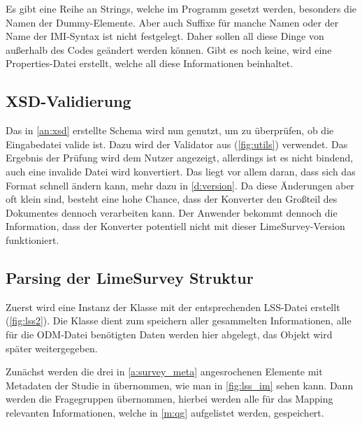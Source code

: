 Es gibt eine Reihe an Strings, welche im Programm gesetzt werden, besonders die Namen der Dummy-Elemente.
Aber auch Suffixe für manche Namen oder der Name der IMI-Syntax ist nicht festgelegt.
Daher sollen all diese Dinge von außerhalb des Codes geändert werden können.
Gibt es noch keine, wird eine Properties-Datei erstellt, welche all diese Informationen beinhaltet.

\subsection{XSD-Validierung}


Das in \cref{an:xsd} erstellte Schema wird nun genutzt, um zu überprüfen, ob die Eingabedatei valide ist.
Dazu wird der Validator aus  (\cref{fig:utils}) verwendet.
Das Ergebnis der Prüfung wird dem Nutzer angezeigt, allerdings ist es nicht bindend, auch eine invalide Datei wird konvertiert.
Das liegt vor allem daran, dass sich das Format schnell ändern kann, mehr dazu in \cref{d:version}.
Da diese Änderungen aber oft klein sind, besteht eine hohe Chance, dass der Konverter den Großteil des Dokumentes dennoch verarbeiten kann.
Der Anwender bekommt dennoch die Information, dass der Konverter potentiell nicht mit dieser LimeSurvey-Version funktioniert.

\subsection{Parsing der LimeSurvey Struktur}

Zuerst wird eine Instanz der Klasse  mit der entsprechenden LSS-Datei erstellt (\cref{fig:lss2}).
Die Klasse  dient zum speichern aller gesammelten Informationen, alle für die ODM-Datei benötigten Daten werden hier abgelegt, das Objekt wird später weitergegeben.

Zunächst werden die drei in \cref{a:survey_meta} angesrochenen Elemente mit Metadaten der Studie in  übernommen, wie man in \cref{fig:lss_im} sehen kann.
Dann werden die Fragegruppen übernommen, hierbei werden alle für das Mapping relevanten Informationen, welche in \cref{m:qg} aufgelistet werden, gespeichert.

